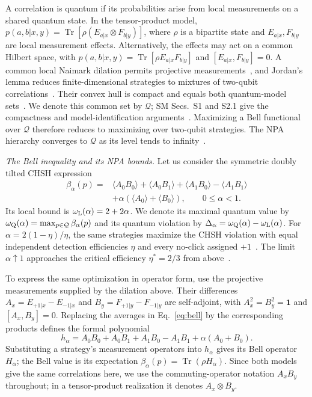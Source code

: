 \documentclass[aps,prl,twocolumn,10pt,superscriptaddress,nofootinbib,longbibliography,nobalancelastpage]{revtex4-2}
\newcommand{\Q}{\mathcal Q}
\newcommand{\id}{\mathbf 1}
\newcommand{\Tr}{\operatorname{Tr}}
\begin{document}
A correlation is quantum if its probabilities arise from local measurements on a shared quantum state. In the tensor-product model, $p(a,b|x,y)=\Tr[\rho(E_{a|x}\otimes F_{b|y})]$, where $\rho$ is a bipartite state and $E_{a|x},F_{b|y}$ are local measurement effects. Alternatively, the effects may act on a common Hilbert space, with $p(a,b|x,y)=\Tr[\rho E_{a|x}F_{b|y}]$ and $[E_{a|x},F_{b|y}]=0$. A common local Naimark dilation permits projective measurements~\cite{Naimark1940}, and Jordan's lemma reduces finite-dimensional strategies to mixtures of two-qubit correlations~\cite{Masanes2005,PanwarPandyaWiesniak2022}. Their convex hull is compact and equals both quantum-model sets~\cite{Masanes2005,Fritz2012}. We denote this common set by $\Q$; SM Secs.~S1 and S2.1 give the compactness and model-identification arguments~\cite{Supplement}. Maximizing a Bell functional over $\Q$ therefore reduces to maximizing over two-qubit strategies. The NPA hierarchy converges to $\Q$ as its level tends to infinity~\cite{NPA2008}.

\emph{The Bell inequality and its NPA bounds.} Let us consider the symmetric doubly tilted CHSH expression
\begin{align}
\beta_\alpha(p)={}&\langle A_0B_0\rangle+\langle A_0B_1\rangle
+\langle A_1B_0\rangle-\langle A_1B_1\rangle\nonumber\\
&+\alpha(\langle A_0\rangle+\langle B_0\rangle),\qquad 0\leq\alpha<1.
\label{eq:bell}
\end{align}
Its local bound is $\omega_{\rm L}(\alpha)=2+2\alpha$. We denote its maximal quantum value by $\omega_{\rm Q}(\alpha)=\max_{p\in\Q}\beta_\alpha(p)$ and its quantum violation by $\Delta_\alpha=\omega_{\rm Q}(\alpha)-\omega_{\rm L}(\alpha)$. For $\alpha=2(1-\eta)/\eta$, the same strategies maximize the CHSH violation with equal independent detection efficiencies $\eta$ and every no-click assigned $+1$~\cite{GigenaEtAl2025}. The limit $\alpha\uparrow1$ approaches the critical efficiency $\eta^*=2/3$ from above~\cite{Eberhard1993}.

To express the same optimization in operator form, use the projective measurements supplied by the dilation above. Their differences $A_x=E_{+1|x}-E_{-1|x}$ and $B_y=F_{+1|y}-F_{-1|y}$ are self-adjoint, with $A_x^2=B_y^2=\id$ and $[A_x,B_y]=0$. Replacing the averages in Eq.~\eqref{eq:bell} by the corresponding products defines the formal polynomial
\[
h_\alpha=A_0B_0+A_0B_1+A_1B_0-A_1B_1+\alpha(A_0+B_0).
\]
Substituting a strategy's measurement operators into $h_\alpha$ gives its Bell operator $H_\alpha$; the Bell value is its expectation $\beta_\alpha(p)=\Tr(\rho H_\alpha)$. Since both models give the same correlations here, we use the commuting-operator notation $A_xB_y$ throughout; in a tensor-product realization it denotes $A_x\otimes B_y$.
\end{document}
